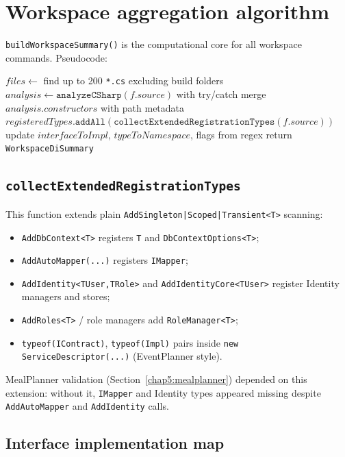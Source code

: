 \section{Workspace aggregation algorithm}
\label{chap4:workspace-algo}

\texttt{buildWorkspaceSummary()} is the computational core for all workspace commands. Pseudocode:

\begin{algorithmic}[1]
\State $files \gets$ find up to 200 \texttt{*.cs} excluding build folders
\State $analysis \gets \texttt{analyzeCSharp}(f.source)$ with try/catch
\State merge $analysis.constructors$ with path metadata
\State $registeredTypes.\texttt{addAll}(\texttt{collectExtendedRegistrationTypes}(f.source))$
\State update $interfaceToImpl$, $typeToNamespace$, flags from regex
\EndFor
\State return \texttt{WorkspaceDiSummary}
\end{algorithmic}

\subsection{\texttt{collectExtendedRegistrationTypes}}

This function extends plain \texttt{AddSingleton|Scoped|Transient<T>} scanning:
\begin{itemize}
	\item \texttt{AddDbContext<T>} registers \texttt{T} and \texttt{DbContextOptions<T>};
	\item \texttt{AddAutoMapper(...)} registers \texttt{IMapper};
	\item \texttt{AddIdentity<TUser,TRole>} and \texttt{AddIdentityCore<TUser>} register Identity managers and stores;
	\item \texttt{AddRoles<T>} / role managers add \texttt{RoleManager<T>};
	\item \texttt{typeof(IContract)}, \texttt{typeof(Impl)} pairs inside \texttt{new ServiceDescriptor(...)} (EventPlanner style).
\end{itemize}

MealPlanner validation (Section~\ref{chap5:mealplanner}) depended on this extension: without it, \texttt{IMapper} and Identity types appeared missing despite \texttt{AddAutoMapper} and \texttt{AddIdentity} calls.

\subsection{Interface implementation map}

